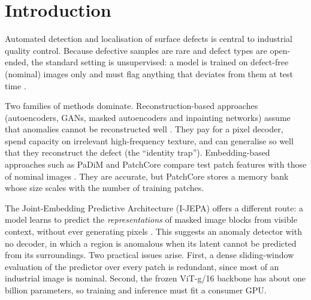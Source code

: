 \documentclass[conference]{IEEEtran}
\begin{document}
\section{Introduction}
Automated detection and localisation of surface defects is central to industrial quality control. Because defective samples are rare and defect types are open-ended, the standard setting is unsupervised: a model is trained on defect-free (nominal) images only and must flag anything that deviates from them at test time \cite{bergmann2019mvtec,bergmann2021mvtec}.

Two families of methods dominate. Reconstruction-based approaches (autoencoders, GANs, masked autoencoders and inpainting networks) assume that anomalies cannot be reconstructed well \cite{he2022mae,zavrtanik2021inpainting,zavrtanik2021draem}. They pay for a pixel decoder, spend capacity on irrelevant high-frequency texture, and can generalise so well that they reconstruct the defect (the ``identity trap''). Embedding-based approaches such as PaDiM and PatchCore compare test patch features with those of nominal images \cite{defard2021padim,roth2022patchcore}. They are accurate, but PatchCore stores a memory bank whose size scales with the number of training patches.

The Joint-Embedding Predictive Architecture (I-JEPA) offers a different route: a model learns to predict the \emph{representations} of masked image blocks from visible context, without ever generating pixels \cite{assran2023ijepa,lecun2022path}. This suggests an anomaly detector with no decoder, in which a region is anomalous when its latent cannot be predicted from its surroundings. Two practical issues arise. First, a dense sliding-window evaluation of the predictor over every patch is redundant, since most of an industrial image is nominal. Second, the frozen ViT-g/16 backbone has about one billion parameters, so training and inference must fit a consumer GPU.
\end{document}
